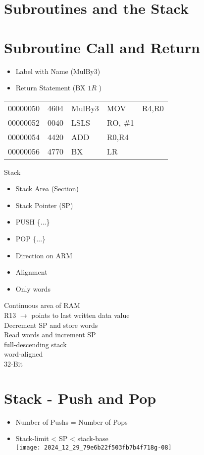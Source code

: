 \section{Subroutines and the Stack}

\section*{Subroutine Call and Return}
\begin{itemize}
  \item Label with Name (MulBy3)
  \item Return Statement (BX $1 R$ )
\end{itemize}

\begin{center}
\begin{tabular}{lllll}
00000050 & 4604 & MulBy3 & MOV & R4,R0 \\
00000052 & 0040 & LSLS & RO, \#1 &  \\
00000054 & 4420 & ADD & R0,R4 &  \\
00000056 & 4770 & BX & LR &  \\
\hline
\end{tabular}
\end{center}

Stack

\begin{itemize}
  \item Stack Area (Section)
  \item Stack Pointer (SP)
  \item PUSH \{...\}
  \item POP \{...\}
  \item Direction on ARM
  \item Alignment
  \item Only words
\end{itemize}

Continuous area of RAM\\
R13 $\rightarrow$ points to last written data value\\
Decrement SP and store words\\
Read words and increment SP\\
full-descending stack\\
word-aligned\\
32-Bit

\section*{Stack - Push and Pop}
\begin{itemize}
  \item Number of Pushs = Number of Pops
  \item Stack-limit < SP < stack-base\\
\texttt{[image: 2024\_12\_29\_79e6b22f503fb7b4f718g-08]}
\end{itemize}

